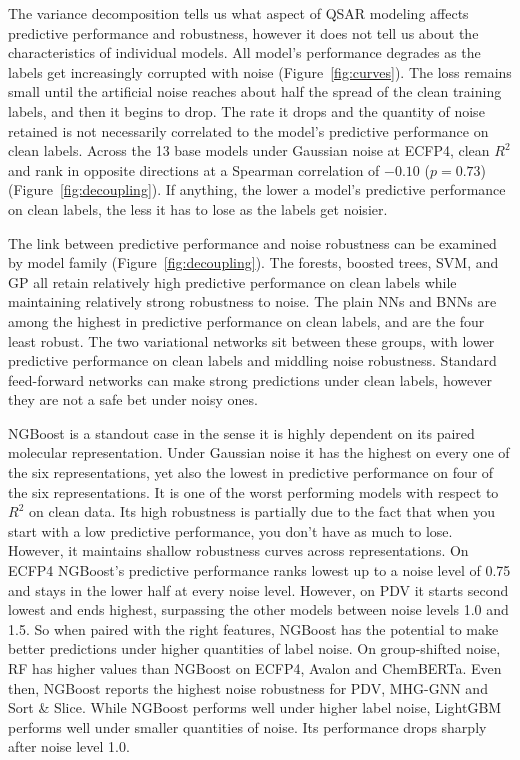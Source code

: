 The variance decomposition tells us what aspect of QSAR modeling affects predictive performance and robustness, however it does not tell us about the characteristics of individual models. All model's performance degrades as the labels get increasingly corrupted with noise (Figure~\ref{fig:curves}). The loss remains small until the artificial noise reaches about half the spread of the clean training labels, and then it begins to drop. The rate it drops and the quantity of noise retained is not necessarily correlated to the model's predictive performance on clean labels. Across the 13 base models under Gaussian noise at ECFP4, clean $R^2$ and \aucnorm{} rank in opposite directions at a Spearman correlation of $-0.10$ ($p = 0.73$) (Figure~\ref{fig:decoupling}). If anything, the lower a model's predictive performance on clean labels, the less it has to lose as the labels get noisier.

The link between predictive performance and noise robustness can be examined by model family (Figure~\ref{fig:decoupling}). The forests, boosted trees, SVM, and GP all retain relatively high predictive performance on clean labels while maintaining relatively strong robustness to noise. The plain NNs and BNNs are among the highest in predictive performance on clean labels, and are the four least robust. The two variational networks sit between these groups, with lower predictive performance on clean labels and middling noise robustness. Standard feed-forward networks can make strong predictions under clean labels, however they are not a safe bet under noisy ones.

NGBoost is a standout case in the sense it is highly dependent on its paired molecular representation. Under Gaussian noise it has the highest \aucnorm{} on every one of the six representations, yet also the lowest in predictive performance on four of the six representations. It is one of the worst performing models with respect to $R^2$ on clean data. Its high robustness is partially due to the fact that when you start with a low predictive performance, you don't have as much to lose. However, it maintains shallow robustness curves across representations. On ECFP4 NGBoost's predictive performance ranks lowest up to a noise level of 0.75 and stays in the lower half at every noise level. However, on PDV it starts second lowest and ends highest, surpassing the other models between noise levels 1.0 and 1.5. So when paired with the right features, NGBoost has the potential to make better predictions under higher quantities of label noise. On group-shifted noise, RF has higher \aucnorm{} values than NGBoost on ECFP4, Avalon and ChemBERTa. Even then, NGBoost reports the highest noise robustness for PDV, MHG-GNN and Sort \& Slice. While NGBoost performs well under higher label noise, LightGBM performs well under smaller quantities of noise. Its performance drops sharply after noise level 1.0.

